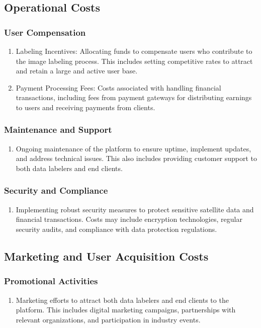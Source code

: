 \documentclass[12pt]{article}
\begin{document}
\subsection{Operational Costs}
\subsubsection{User Compensation}
\begin{enumerate}
  \item Labeling Incentives: Allocating funds to compensate users who contribute to the image labeling process. This includes setting competitive rates to attract and retain a large and active user base.
  \item Payment Processing Fees: Costs associated with handling financial transactions, including fees from payment gateways for distributing earnings to users and receiving payments from clients.
  \end{enumerate}
\subsubsection{Maintenance and Support}
\begin{enumerate}
  \item Ongoing maintenance of the platform to ensure uptime, implement updates, and address technical issues. This also includes providing customer support to both data labelers and end clients.
  \end{enumerate}
\subsubsection{Security and Compliance}
\begin{enumerate}
  \item Implementing robust security measures to protect sensitive satellite data and financial transactions. Costs may include encryption technologies, regular security audits, and compliance with data protection regulations.
  \end{enumerate}

\subsection{Marketing and User Acquisition Costs}
\subsubsection{Promotional Activities}
\begin{enumerate}
  \item Marketing efforts to attract both data labelers and end clients to the platform. This includes digital marketing campaigns, partnerships with relevant organizations, and participation in industry events.
  \end{enumerate}
\end{document}
